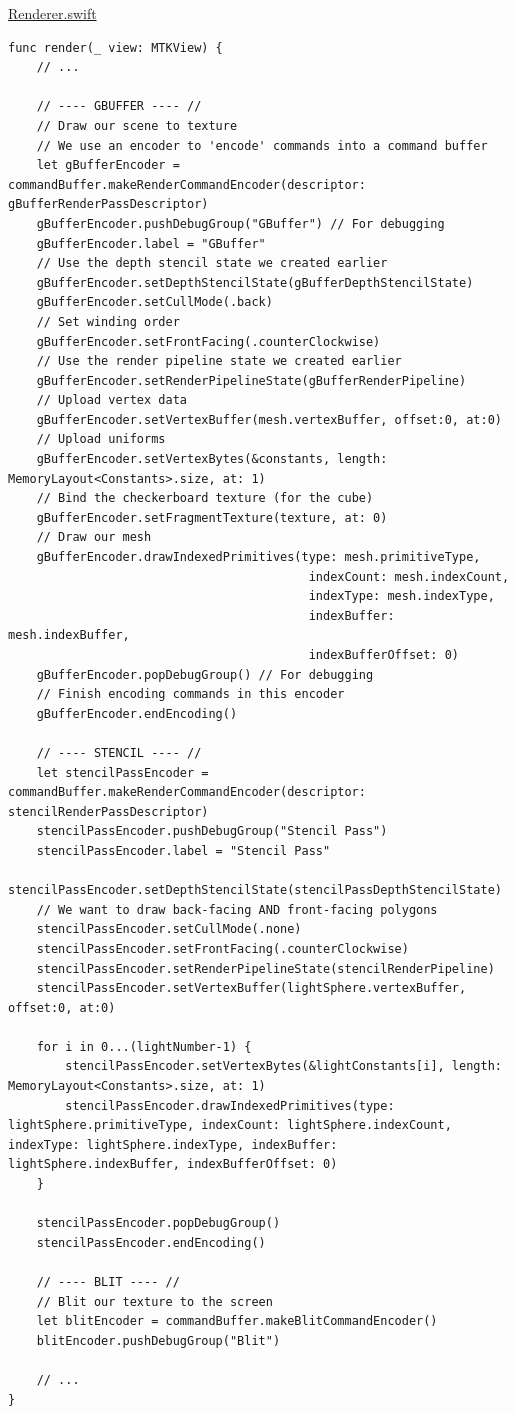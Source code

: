 \documentclass[11pt]{article}
\begin{document}
\uline{Renderer.swift}
\begin{verbatim}
func render(_ view: MTKView) {
    // ...

    // ---- GBUFFER ---- //
    // Draw our scene to texture
    // We use an encoder to 'encode' commands into a command buffer
    let gBufferEncoder = commandBuffer.makeRenderCommandEncoder(descriptor: gBufferRenderPassDescriptor)
    gBufferEncoder.pushDebugGroup("GBuffer") // For debugging
    gBufferEncoder.label = "GBuffer"
    // Use the depth stencil state we created earlier
    gBufferEncoder.setDepthStencilState(gBufferDepthStencilState)
    gBufferEncoder.setCullMode(.back)
    // Set winding order
    gBufferEncoder.setFrontFacing(.counterClockwise)
    // Use the render pipeline state we created earlier
    gBufferEncoder.setRenderPipelineState(gBufferRenderPipeline)
    // Upload vertex data
    gBufferEncoder.setVertexBuffer(mesh.vertexBuffer, offset:0, at:0)
    // Upload uniforms
    gBufferEncoder.setVertexBytes(&constants, length: MemoryLayout<Constants>.size, at: 1)
    // Bind the checkerboard texture (for the cube)
    gBufferEncoder.setFragmentTexture(texture, at: 0)
    // Draw our mesh
    gBufferEncoder.drawIndexedPrimitives(type: mesh.primitiveType,
                                          indexCount: mesh.indexCount,
                                          indexType: mesh.indexType,
                                          indexBuffer: mesh.indexBuffer,
                                          indexBufferOffset: 0)
    gBufferEncoder.popDebugGroup() // For debugging
    // Finish encoding commands in this encoder
    gBufferEncoder.endEncoding()

    // ---- STENCIL ---- //
    let stencilPassEncoder = commandBuffer.makeRenderCommandEncoder(descriptor: stencilRenderPassDescriptor)
    stencilPassEncoder.pushDebugGroup("Stencil Pass")
    stencilPassEncoder.label = "Stencil Pass"
    stencilPassEncoder.setDepthStencilState(stencilPassDepthStencilState)
    // We want to draw back-facing AND front-facing polygons
    stencilPassEncoder.setCullMode(.none)
    stencilPassEncoder.setFrontFacing(.counterClockwise)
    stencilPassEncoder.setRenderPipelineState(stencilRenderPipeline)
    stencilPassEncoder.setVertexBuffer(lightSphere.vertexBuffer, offset:0, at:0)

    for i in 0...(lightNumber-1) {
        stencilPassEncoder.setVertexBytes(&lightConstants[i], length: MemoryLayout<Constants>.size, at: 1)
        stencilPassEncoder.drawIndexedPrimitives(type: lightSphere.primitiveType, indexCount: lightSphere.indexCount, indexType: lightSphere.indexType, indexBuffer: lightSphere.indexBuffer, indexBufferOffset: 0)
    }

    stencilPassEncoder.popDebugGroup()
    stencilPassEncoder.endEncoding()

    // ---- BLIT ---- //
    // Blit our texture to the screen
    let blitEncoder = commandBuffer.makeBlitCommandEncoder()
    blitEncoder.pushDebugGroup("Blit")

    // ...
}
\end{verbatim}
\end{document}
